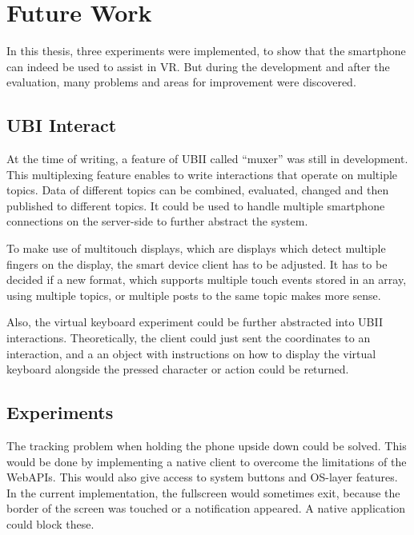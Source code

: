 \chapter{Future Work}\label{chapter:future-work}

In this thesis, three experiments were implemented, to show that the smartphone can indeed be used to assist in \ac{VR}. But during the development and after the evaluation, many problems and areas for improvement were discovered. 


\section{UBI Interact}\label{section:fw-ubii}

At the time of writing, a feature of \ac{UBII} called \enquote{muxer} was still in development. This multiplexing feature enables to write interactions that operate on multiple topics. Data of different topics can be combined, evaluated, changed and then published to different topics. It could be used to handle multiple smartphone connections on the server-side to further abstract the system.

To make use of multitouch displays, which are displays which detect multiple fingers on the display, the smart device client has to be adjusted. It has to be decided if a new format, which supports multiple touch events stored in an array, using multiple topics, or multiple posts to the same topic makes more sense.

Also, the virtual keyboard experiment could be further abstracted into \ac{UBII} interactions. Theoretically, the client could just sent the coordinates to an interaction, and a an object with instructions on how to display the virtual keyboard alongside the pressed character or action could be returned.


\section{Experiments}\label{section:fw-experiments}

The tracking problem when holding the phone upside down could be solved. This would be done by implementing a native client to overcome the limitations of the WebAPIs. This would also give access to system buttons and \ac{OS}-layer features. In the current implementation, the fullscreen would sometimes exit, because the border of the screen was touched or a notification appeared. A native application could block these.

